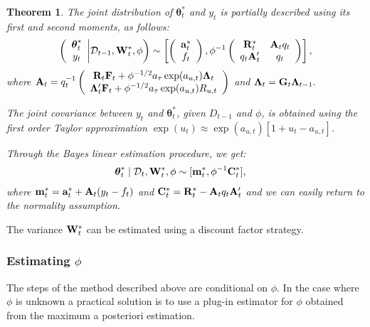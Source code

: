 \documentclass[12pt,a4paper]{article}\usepackage[]{graphicx}\usepackage[]{color}\usepackage{subfigure}
\newtheorem{myth}{Theorem}[section]
\newcommand{\bftheta}{\boldsymbol{\theta}}
\newcommand{\mathD}{\mathcal{D}}
\begin{document}
\begin{myth}\label{Teo3}
The joint distribution of $\bftheta^*_t$ and $y_t$ is partially described using its first and second moments, as follows:
\begin{align*}
\left(\begin{array}{c}\bftheta^*_t\\ y_t\end{array} \bigg| \mathD_{t-1},{\bf W}^*_t,\phi\right)\sim  \left[\left(\begin{array}{c}{\bf a}_{t}^*\\f_t\end{array}\right),
  \phi^{-1}\left(\begin{array}{cc}{\bf R}^*_{t}&{\bf A}_tq_t\\q_t{\bf A}_t' & q_t\end{array}\right)\right],
\end{align*}
where ${\bf A}_t= q_t^{-1}\left(\begin{array}{c}{\bf R}_t{\bf F}_t+\phi^{-1/2}a_{\tau}\exp(a_{u,t}){\bf \Lambda}_t\\
{\bf \Lambda}_t'{\bf F}_t+\phi^{-1/2}a_{\tau}\exp(a_{u,t})R_{u,t}\end{array}\right)$ and ${\bf \Lambda}_t = {\bf G}_t{\bf \Lambda}_{t-1}.$

The joint covariance between $y_t$ and $\bftheta_t^*$,  given $D_{t-1}$ and $\phi$, is obtained using the first order Taylor approximation 
$\exp(u_t)\approx\exp(a_{u,t})[1+u_t-a_{u,t}]$. 

Through the Bayes linear estimation procedure, we get:
\begin{align}\label{post_thet_condU_BL}
 \bftheta_{t}^*\mid \mathD_{t}, {\bf W}^*_t,\phi &\sim [{\bf m}^*_{t},\phi^{-1}{\bf C}^*_{t}],
  \end{align}
 where $ {\bf m}^*_{t}={\bf a}^*_t+{\bf A}_t(y_t-f_t)$ and ${\bf C}_t^* = {\bf R}^*_t - {\bf A}_tq_t {\bf A}'_t$ and we can easily return to the normality assumption.
\end{myth}

The variance ${\bf W}_t^*$ can be estimated using a discount factor strategy.


\subsubsection{Estimating $\phi$}
\medskip

The steps of the method described above are conditional on $\phi$. In the case where $\phi$ is unknown a practical solution is to use a plug-in estimator for $\phi$ obtained from the maximum a posteriori estimation.
\end{document}
